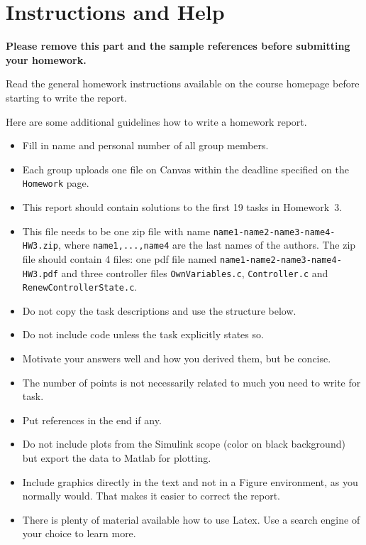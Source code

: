 
\section*{Instructions and Help}

\textbf{Please remove this part and the sample references before submitting your homework.}

Read the general homework instructions available on the course homepage before starting to write the report.

Here are some additional guidelines how to write a homework report.
\begin{itemize}
 \item Fill in name and personal number of all group members.
 \item Each group uploads one file on Canvas within the deadline specified on the \texttt{Homework} page.
 \item This report should contain solutions to the first 19 tasks in Homework~3.
 \item This file needs to be one zip file with name \texttt{name1-name2-name3-name4-HW3.zip}, where \texttt{name1,...,name4} are the last names of the authors. The zip file should contain 4 files: one pdf file named \texttt{name1-name2-name3-name4-HW3.pdf} and three controller files \texttt{OwnVariables.c}, \texttt{Controller.c} and
 \texttt{RenewControllerState.c}.
 \item Do not copy the task descriptions and use the structure below.
 \item Do not include code unless the task explicitly states so.
 \item Motivate your answers well and how you derived them, but be concise.
 \item The number of points is not necessarily related to much you need to write for task.
 \item Put references in the end if any.
 \item Do not include plots from the Simulink scope (color on black background) but export the data to Matlab for plotting.
 \item Include graphics directly in the text and not in a Figure environment, as you normally would. That makes it easier to correct the report.
 \item There is plenty of material available how to use Latex. Use a search engine of your choice to learn more.
\end{itemize}

